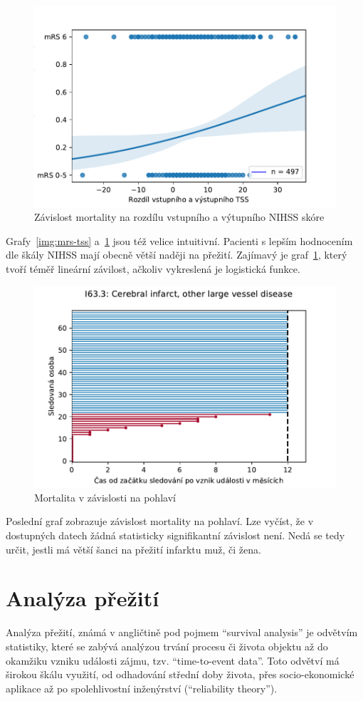 \begin{figure}[htbp]
    \includegraphics[width=.6\textwidth]{img/image_5.pdf}
    \centering
    \caption{Závislost mortality na rozdílu vstupního a výtupního NIHSS skóre}
    \label{img:mrs-tss2}
\end{figure}
\FloatBarrier

Grafy~\ref{img:mrs-tss} a~\ref{img:mrs-tss2} jsou též velice intuitivní.
Pacienti s lepším hodnocením dle škály NIHSS mají obecně větší naději na přežití.
Zajímavý je graf~\ref{img:mrs-tss2}, který tvoří téměř lineární závilost, ačkoliv vykreslená je logistická funkce.

\begin{figure}[htbp]
    \includegraphics[width=.6\textwidth]{img/image_6.pdf}
    \centering
    \caption{Mortalita v závislosti na pohlaví}
\end{figure}
\FloatBarrier

Poslední graf zobrazuje závislost mortality na pohlaví.
Lze vyčíst, že v dostupných datech žádná statisticky signifikantní závislost není.
Nedá se tedy určit, jestli má větší šanci na přežití infarktu muž, či žena.

\section{Analýza přežití}

Analýza přežití, známá v angličtině pod pojmem \enquote{survival analysis} je odvětvím statistiky, které se zabývá analýzou trvání procesu či života objektu až do okamžiku vzniku události zájmu, tzv. \enquote{time-to-event data}.
Toto odvětví má širokou škálu využití, od odhadování střední doby života, přes socio-ekonomické aplikace až po spolehlivostní inženýrství (\enquote{reliability theory}).

